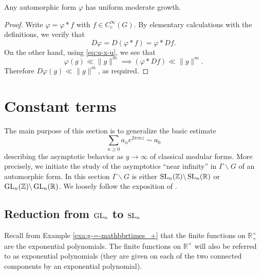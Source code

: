 \documentclass[reqno]{amsart} 
\begin{document}
\begin{proposition}
  Any automorphic form $\varphi$ has uniform moderate growth.
\end{proposition}
\begin{proof}
  Write $\varphi = \varphi \ast f$ with $f \in C_c^\infty(G)$.
  By elementary calculations with the definitions,
  we verify that
  \begin{equation*}
    D \varphi = D (\varphi \ast f) = \varphi \ast D f.
  \end{equation*}
  On the other hand, using \eqref{eq:u-x-u},
  we see that
  \begin{equation*}
    \varphi(g) \ll \|g\|^m
    \implies
    (\varphi \ast D f) \ll \|g\|^m.
  \end{equation*}
  Therefore $D \varphi(g) \ll \|g\|^m$, as required.
\end{proof}

\section{Constant terms}
The main purpose of this section is to generalize the basic estimate
\begin{equation}\label{eq:sum_n-geq-0}
  \sum_{n \geq 0} a_n e^{2 \pi i n z} \sim a_0
\end{equation}
describing the asymptotic behavior as $y \rightarrow \infty$ of classical modular forms.  More precisely, we initiate the study of the asymptotics ``near infinity'' in $\Gamma \backslash G$ of an automorphic form.  In this section $\Gamma \backslash G$ is either $\operatorname{SL}_n(\mathbb{Z}) \backslash \operatorname{SL}_n(\mathbb{R})$ or $\operatorname{GL}_n(\mathbb{Z}) \backslash \operatorname{GL}_n(\mathbb{R})$.  We loosely follow the exposition of \cite[\S5--6]{MR2331343}.

\subsection{Reduction from $\operatorname{GL}_n$ to $\operatorname{SL}_n$}\label{sec:reduction-from-gl_n}
Recall from Example \ref{exa:g-=-mathbbrtimes_+} that the finite functions on $\mathbb{R}^\times_+$ are the exponential polynomials.  The finite functions on $\mathbb{R}^\times$ will also be referred to as exponential polynomials (they are given on each of the two connected components by an exponential polynomial).
\end{document}
